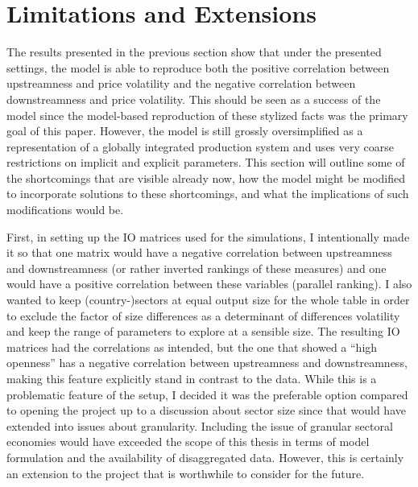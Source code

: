 \section{Limitations and Extensions}
\label{sec:limit}

The results presented in the previous section show that under the presented settings, the model is able to reproduce both the 
positive correlation between upstreamness and price volatility and the negative correlation between downstreamness and price volatility.
This should be seen as a success of the model since the model-based reproduction of these stylized facts was the primary goal 
of this paper. However, the model is still grossly oversimplified as a representation of a globally integrated production system and uses 
very coarse restrictions on implicit and explicit parameters. This section will outline some of the shortcomings that are visible already 
now, how the model might be modified to incorporate solutions to these shortcomings, and what the implications of such modifications would 
be. 

First, in setting up the IO matrices used for the simulations, I intentionally made it so that one matrix would have a negative correlation 
between upstreamness and downstreamness (or rather inverted rankings of these measures) and one would have a positive correlation between
these variables (parallel ranking). I also wanted to keep (country-)sectors at equal output size for the whole table in order to 
exclude the factor of size differences as a determinant of differences volatility and keep the range of parameters to explore at a 
sensible size. The resulting IO matrices had the correlations as intended, but the one that showed a ``high openness'' has a negative 
correlation between upstreamness and downstreamness, making this feature explicitly stand in contrast to the data. While this is 
a problematic feature of the setup, I decided it was the preferable option compared to opening the project up to a discussion 
about sector size since that would have extended into issues about granularity. Including the issue of granular sectoral economies would 
have exceeded the scope of this thesis in terms of model formulation and the availability of disaggregated data. However, this is 
certainly an extension to the project that is worthwhile to consider for the future.


